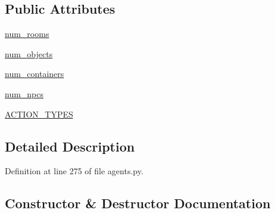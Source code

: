 \subsection*{Public Attributes}
\begin{DoxyCompactItemize}
\item 
\hyperlink{classmastering__the__dungeon_1_1agents_1_1graph__world2_1_1agents_1_1ObjectChecklistDataAgent_aaab212db75c1b6f2ce5da74bfc4f60cf}{num\+\_\+rooms}
\item 
\hyperlink{classmastering__the__dungeon_1_1agents_1_1graph__world2_1_1agents_1_1ObjectChecklistDataAgent_a2bb2a3fd6595ac8207fabde268ad06eb}{num\+\_\+objects}
\item 
\hyperlink{classmastering__the__dungeon_1_1agents_1_1graph__world2_1_1agents_1_1ObjectChecklistDataAgent_a8e8978ea0d5e3271638e617bba63748f}{num\+\_\+containers}
\item 
\hyperlink{classmastering__the__dungeon_1_1agents_1_1graph__world2_1_1agents_1_1ObjectChecklistDataAgent_a5110b6927552ef9d64b246b054af739f}{num\+\_\+npcs}
\item 
\hyperlink{classmastering__the__dungeon_1_1agents_1_1graph__world2_1_1agents_1_1ObjectChecklistDataAgent_a45ff71286876401d4dff6aa5b225f06d}{A\+C\+T\+I\+O\+N\+\_\+\+T\+Y\+P\+ES}
\end{DoxyCompactItemize}


\subsection{Detailed Description}


Definition at line 275 of file agents.\+py.



\subsection{Constructor \& Destructor Documentation}
\mbox{\label{classmastering__the__dungeon_1_1agents_1_1graph__world2_1_1agents_1_1ObjectChecklistDataAgent_a6fc3e58b206ddb4d89b6923b946d24ed}} 
